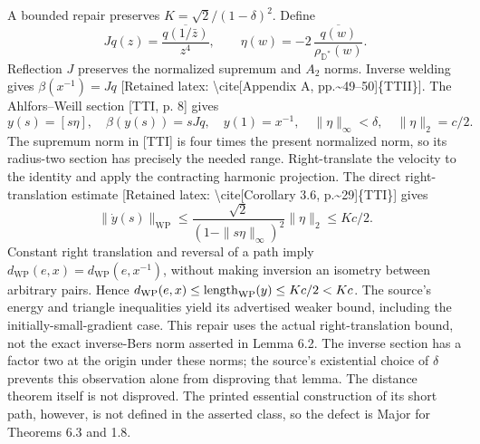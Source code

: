 \documentclass[10pt]{article}
\begin{document}
A bounded repair preserves \(K=\sqrt2/(1-\delta)^2\). Define \[Jq(z)=\frac{\overline{q(1/\bar z)}}{z^4},\qquad
 \eta(w)=-2\,\frac{\overline{q(w)}}{\rho_{\mathbb D^*}(w)}.\] Reflection \(J\) preserves the normalized supremum and \(A_2\) norms. Inverse welding gives \(\beta(x^{-1})=Jq\) [Retained latex: \textbackslash{}cite[Appendix A, pp.\textasciitilde{}49--50]\{TTII\}]. The Ahlfors–Weill section [TTI, p. 8] gives \[y(s)=[s\eta],\quad \beta(y(s))=sJq,\quad y(1)=x^{-1},
 \quad \|\eta\|_\infty<\delta,\quad \|\eta\|_2=c/2 .\] The supremum norm in [TTI] is four times the present normalized norm, so its radius-two section has precisely the needed range. Right-translate the velocity to the identity and apply the contracting harmonic projection. The direct right-translation estimate [Retained latex: \textbackslash{}cite[Corollary 3.6, p.\textasciitilde{}29]\{TTI\}] gives \[\|\dot y(s)\|_{\mathrm{WP}}\leq
 \frac{\sqrt2}{(1-\|s\eta\|_\infty)^2}\|\eta\|_2\leq Kc/2 .\] Constant right translation and reversal of a path imply \(d_{\mathrm{WP}}(e,x)=d_{\mathrm{WP}}(e,x^{-1})\), without making inversion an isometry between arbitrary pairs. Hence \(d_{\mathrm{WP}}(e,x)\leq{\rm length}_{\mathrm{WP}}(y)\leq Kc/2<Kc\). The source’s energy and triangle inequalities yield its advertised weaker bound, including the initially-small-gradient case. This repair uses the actual right-translation bound, not the exact inverse-Bers norm asserted in Lemma 6.2. The inverse section has a factor two at the origin under these norms; the source’s existential choice of \(\delta\) prevents this observation alone from disproving that lemma. The distance theorem itself is not disproved. The printed essential construction of its short path, however, is not defined in the asserted class, so the defect is Major for Theorems 6.3 and 1.8.\par
\end{document}
